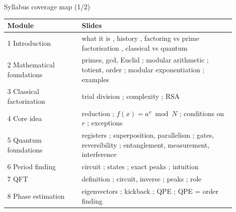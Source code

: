 \documentclass[aspectratio=169,11pt]{beamer}
\begin{document}
\begin{frame}{Syllabus coverage map (1/2)}
  \scriptsize
  \begin{tabular}{p{0.3\linewidth}p{0.62\linewidth}}
    \toprule \textbf{Module} & \textbf{Slides}\\ \midrule
    1 Introduction & what it is \pageref{fWhat}, history \pageref{fHistory}, factoring vs prime factorisation \pageref{fFactoring}, classical vs quantum \pageref{fClassVsQuantum}\\
    2 Mathematical foundations & primes, gcd, Euclid \pageref{fIntegers}; modular arithmetic \pageref{fModular}; totient, order \pageref{fTotient}; modular exponentiation \pageref{fModExp}; examples \pageref{fNTExamples}\\
    3 Classical factorization & trial division \pageref{fTrial}; complexity \pageref{fComplexity}; RSA \pageref{fRSAdep}\\
    4 Core idea & reduction \pageref{fReduction}; $f(x) = a^x \bmod N$ \pageref{fPeriodic}; conditions on $r$ \pageref{fWhyEven}; exceptions \pageref{fPrimePower}\\
    5 Quantum foundations & registers \pageref{fRegisters}; superposition, parallelism \pageref{fSuperposition}; gates, reversibility \pageref{fGates}; entanglement, measurement, interference \pageref{fEntangle}\\
    6 Period finding & circuit \pageref{fPFCircuit}; states \pageref{fPFState}; exact peaks \pageref{fPFExact}; intuition \pageref{fPFIntuition}\\
    7 QFT & definition \pageref{fQFTDef}; circuit, inverse \pageref{fQFTCircuit}; peaks \pageref{fQFTPeaks}; role \pageref{fQFTRole}\\
    8 Phase estimation & eigenvectors \pageref{fEigen}; kickback \pageref{fKickback}; QPE \pageref{fQPE}; QPE = order finding \pageref{fQPEOrder}\\ \bottomrule
  \end{tabular}
\end{frame}
\end{document}
